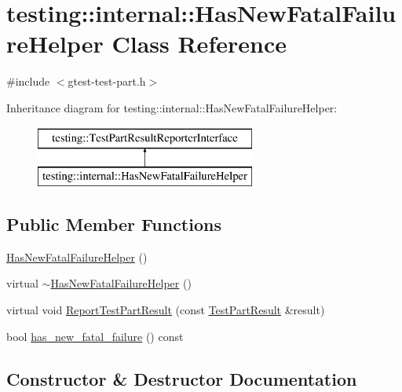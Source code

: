 \hypertarget{classtesting_1_1internal_1_1_has_new_fatal_failure_helper}{}\section{testing\+::internal\+::Has\+New\+Fatal\+Failure\+Helper Class Reference}
\label{classtesting_1_1internal_1_1_has_new_fatal_failure_helper}


{\ttfamily \#include $<$gtest-\/test-\/part.\+h$>$}

Inheritance diagram for testing\+::internal\+::Has\+New\+Fatal\+Failure\+Helper\+:\begin{figure}[H]
\begin{center}
\leavevmode
\includegraphics[height=2.000000cm]{classtesting_1_1internal_1_1_has_new_fatal_failure_helper}
\end{center}
\end{figure}
\subsection*{Public Member Functions}
\begin{DoxyCompactItemize}
\item 
\mbox{\hyperlink{classtesting_1_1internal_1_1_has_new_fatal_failure_helper_a59190a7188db558c00b4c6bf9251859a}{Has\+New\+Fatal\+Failure\+Helper}} ()
\item 
virtual \mbox{\hyperlink{classtesting_1_1internal_1_1_has_new_fatal_failure_helper_ae9207df58c9ca17b8243b6b664b402fa}{$\sim$\+Has\+New\+Fatal\+Failure\+Helper}} ()
\item 
virtual void \mbox{\hyperlink{classtesting_1_1internal_1_1_has_new_fatal_failure_helper_ac7b5e77c9847b2b057cb97193ba82441}{Report\+Test\+Part\+Result}} (const \mbox{\hyperlink{classtesting_1_1_test_part_result}{Test\+Part\+Result}} \&result)
\item 
bool \mbox{\hyperlink{classtesting_1_1internal_1_1_has_new_fatal_failure_helper_a91b7bac47f09076db4be0304a2110a9e}{has\+\_\+new\+\_\+fatal\+\_\+failure}} () const
\end{DoxyCompactItemize}


\subsection{Constructor \& Destructor Documentation}
\mbox{\label{classtesting_1_1internal_1_1_has_new_fatal_failure_helper_a59190a7188db558c00b4c6bf9251859a}} 
